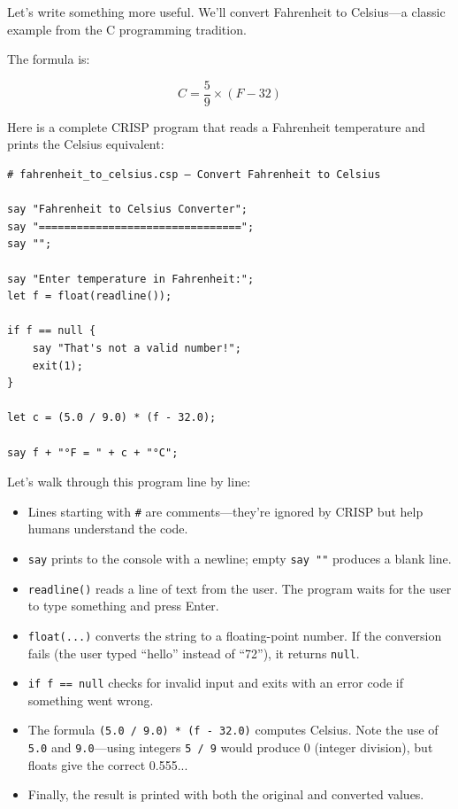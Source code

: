 Let's write something more useful. We'll convert Fahrenheit to Celsius—a classic example from the C programming tradition.

The formula is:

\[
C = \frac{5}{9} \times (F - 32)
\]

Here is a complete CRISP program that reads a Fahrenheit temperature and prints the Celsius equivalent:

\begin{tcolorbox}[colback=codebg, colframe=darkpurple, colbacktitle=darkpurple, title=\textbf{\textcolor{codegold}{Fahrenheit to Celsius Converter (fahrenheit\_to\_celsius.csp)}}, fonttitle=\bfseries, sharp corners]
\begin{lstlisting}
# fahrenheit_to_celsius.csp — Convert Fahrenheit to Celsius

say "Fahrenheit to Celsius Converter";
say "================================";
say "";

say "Enter temperature in Fahrenheit:";
let f = float(readline());

if f == null {
    say "That's not a valid number!";
    exit(1);
}

let c = (5.0 / 9.0) * (f - 32.0);

say f + "°F = " + c + "°C";
\end{lstlisting}
\end{tcolorbox}

Let's walk through this program line by line:

\begin{itemize}
    \item Lines starting with \texttt{\#} are comments—they're ignored by CRISP but help humans understand the code.
    \item \texttt{say} prints to the console with a newline; empty \texttt{say ""} produces a blank line.
    \item \texttt{readline()} reads a line of text from the user. The program waits for the user to type something and press Enter.
    \item \texttt{float(...)} converts the string to a floating-point number. If the conversion fails (the user typed ``hello'' instead of ``72''), it returns \texttt{null}.
    \item \texttt{if f == null} checks for invalid input and exits with an error code if something went wrong.
    \item The formula \texttt{(5.0 / 9.0) * (f - 32.0)} computes Celsius. Note the use of \texttt{5.0} and \texttt{9.0}—using integers \texttt{5 / 9} would produce 0 (integer division), but floats give the correct 0.555...
    \item Finally, the result is printed with both the original and converted values.
\end{itemize}

